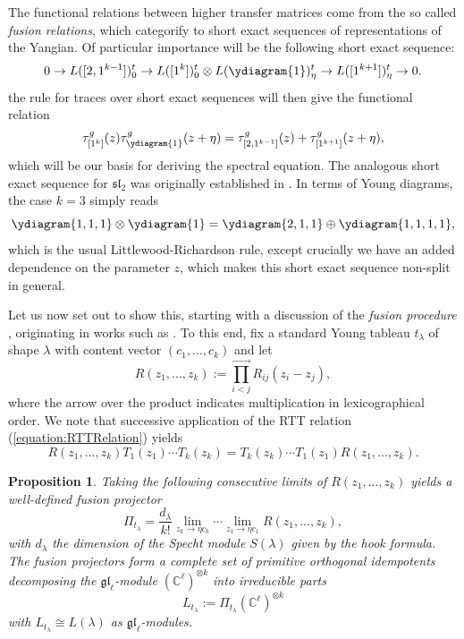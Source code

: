 \documentclass[11pt]{report}
\newtheorem{prop}[theorem]{Proposition}
\theoremstyle{definition}
\theoremstyle{remark}
\theoremstyle{remark}
\newcommand{\C}{\mathbb{C}}
\begin{document}
The functional relations between higher transfer matrices come from the so called \emph{fusion relations}, which categorify to short exact sequences of representations of the Yangian. Of particular importance will be the following short exact sequence:
\begin{equation*}
0 \to L([2,1^{k-1}])_0^t \to L([1^k])_0^t \otimes L(\ydiagram{1})_\eta^t \to L([1^{k+1}])_\eta^t \to 0.
\end{equation*}
the rule for traces over short exact sequences will then give the functional relation
\begin{equation*}
\tau_{[1^k]}^g(z) \tau_{\ydiagram{1}}^g(z+\eta) = \tau_{[2,1^{k-1}]}^g(z) + \tau_{[1^{k+1}]}^g(z+\eta),
\end{equation*}
which will be our basis for deriving the spectral equation. The analogous short exact sequence for $\mathfrak{sl}_2$ was originally established in \cite{article:chari:1990}. In terms of Young diagrams, the case $k=3$ simply reads
\begin{equation*}
\ydiagram{1,1,1} \otimes \ydiagram{1} = \ydiagram{2,1,1} \oplus \ydiagram{1,1,1,1},
\end{equation*}
which is the usual Littlewood-Richardson rule, except crucially we have an added dependence on the parameter $z$, which makes this short exact sequence non-split in general.

Let us now set out to show this, starting with a discussion of the \emph{fusion procedure} \cite{article:molev:2008}, originating in works such as \cite{article:kulish:1981}. To this end, fix a standard Young tableau $t_\lambda$ of shape $\lambda$ with content vector $(c_1,...,c_k)$ and let
\begin{equation*}
R(z_1,...,z_k) := \overset{\longrightarrow}{\prod_{i<j}} R_{ij}(z_i-z_j),
\end{equation*}
where the arrow over the product indicates multiplication in lexicographical order. We note that successive application of the RTT relation (\ref{equation:RTTRelation}) yields
\begin{equation}\label{equation:higherRTT}
R(z_1,...,z_k) T_1(z_1) \cdots T_k(z_k) = T_k(z_k) \cdots T_1(z_1) R(z_1,...,z_k).
\end{equation}

\begin{prop}\label{prop:fusionDecomposition}
Taking the following consecutive limits of $R(z_1,...,z_k)$ yields a well-defined \emph{fusion projector}
\begin{equation*}
\Pi_{t_\lambda} = \frac{d_\lambda}{k!} \lim_{z_k \to \eta c_k} \cdots \lim_{z_1 \to \eta c_1} R(z_1,...,z_k),
\end{equation*}
with $d_\lambda$ the dimension of the Specht module $S(\lambda)$ given by the hook formula. The fusion projectors form a complete set of primitive orthogonal idempotents decomposing the $\mathfrak{gl}_\ell$-module $(\C^\ell)^{\otimes k}$ into irreducible parts
\begin{equation*}
L_{t_\lambda} := \Pi_{t_\lambda} (\C^\ell)^{\otimes k}
\end{equation*}
with $L_{t_\lambda} \cong L(\lambda)$ as $\mathfrak{gl}_\ell$-modules.
\end{prop}
\end{document}
